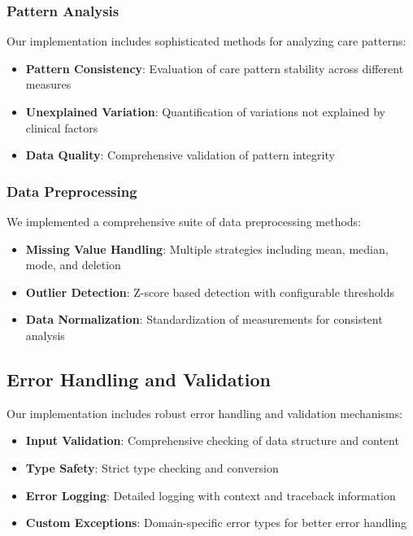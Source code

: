 \documentclass[12pt]{article}
\begin{document}
\subsubsection{Pattern Analysis}

Our implementation includes sophisticated methods for analyzing care patterns:
\begin{itemize}
    \item \textbf{Pattern Consistency}: Evaluation of care pattern stability across different measures
    \item \textbf{Unexplained Variation}: Quantification of variations not explained by clinical factors
    \item \textbf{Data Quality}: Comprehensive validation of pattern integrity
\end{itemize}

\subsubsection{Data Preprocessing}

We implemented a comprehensive suite of data preprocessing methods:
\begin{itemize}
    \item \textbf{Missing Value Handling}: Multiple strategies including mean, median, mode, and deletion
    \item \textbf{Outlier Detection}: Z-score based detection with configurable thresholds
    \item \textbf{Data Normalization}: Standardization of measurements for consistent analysis
\end{itemize}

\subsection{Error Handling and Validation}

Our implementation includes robust error handling and validation mechanisms:
\begin{itemize}
    \item \textbf{Input Validation}: Comprehensive checking of data structure and content
    \item \textbf{Type Safety}: Strict type checking and conversion
    \item \textbf{Error Logging}: Detailed logging with context and traceback information
    \item \textbf{Custom Exceptions}: Domain-specific error types for better error handling
\end{itemize}
\end{document}
